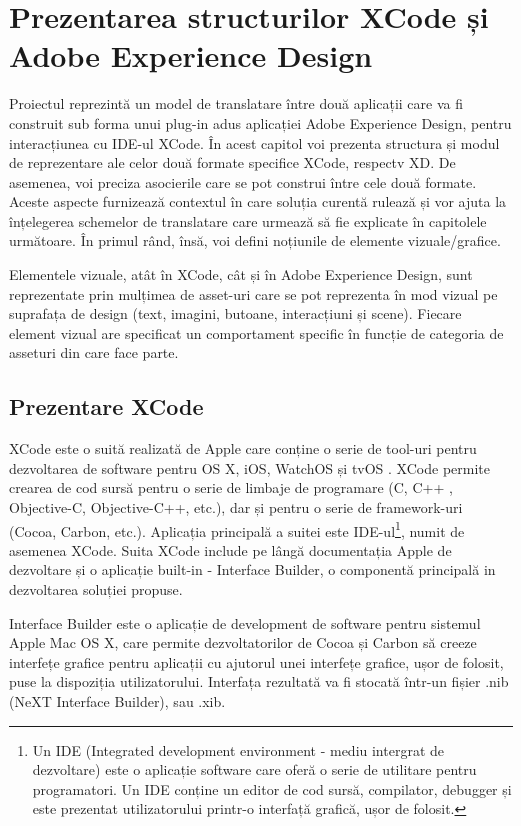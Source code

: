 \chapter{Prezentarea structurilor XCode și Adobe Experience Design}


Proiectul reprezintă un model de translatare între două aplicații care va fi construit sub forma unui plug-in adus aplicației Adobe Experience Design, pentru interacțiunea cu IDE-ul XCode. 
În acest capitol voi prezenta structura și modul de reprezentare ale celor două formate specifice XCode, respectv XD. De asemenea, voi preciza asocierile care se pot construi între cele două formate. Aceste aspecte furnizează contextul în care soluția curentă rulează și vor ajuta la înțelegerea schemelor de translatare care urmează să fie explicate în capitolele următoare. În primul rând, însă, voi defini noțiunile de elemente vizuale/grafice.

Elementele vizuale, atât în XCode, cât și în Adobe Experience Design, sunt reprezentate prin mulțimea de asset-uri care se pot reprezenta în mod vizual pe suprafața de design (text, imagini, butoane, interacțiuni și scene). Fiecare element vizual are specificat un comportament specific în funcție de categoria de asseturi din care face parte.


\section{Prezentare XCode}

XCode este o suită realizată de Apple care conține o serie de tool-uri pentru dezvoltarea de software pentru OS X, iOS, WatchOS și tvOS \cite{Aboutxcode}. XCode permite crearea de cod sursă pentru o serie de limbaje de programare (C, C++ , Objective-C, Objective-C++, etc.), dar și pentru o serie de framework-uri (Cocoa, Carbon, etc.). Aplicația principală a suitei este IDE-ul\footnote{Un IDE (Integrated development environment - mediu intergrat de dezvoltare) este o aplicație software care oferă o serie de utilitare pentru programatori. Un IDE conține un editor de cod sursă, compilator, debugger și este prezentat utilizatorului printr-o interfață grafică, ușor de folosit.}, numit de asemenea XCode. Suita XCode include pe lângă documentația Apple de dezvoltare și o aplicație built-in - Interface Builder, o componentă principală in dezvoltarea soluției propuse.

Interface Builder este o aplicație de development de software pentru sistemul Apple Mac OS X, care permite dezvoltatorilor de Cocoa și Carbon să creeze interfețe grafice pentru aplicații cu ajutorul unei interfețe grafice, ușor de folosit, puse la dispoziția utilizatorului. Interfața rezultată va fi stocată într-un fișier .nib (NeXT Interface Builder), sau .xib.

